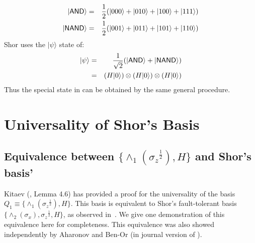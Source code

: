 \documentclass[twocolumn,11pt]{article}
\newcommand{\sqrtsz}{{\sigma_z}^{\frac{1}{2}}}
\begin{document}
\begin{eqnarray*}
|\mbox{\sf AND}\rangle &=&
\frac{1}{2}(|000\rangle+|010\rangle+|100\rangle+|111\rangle) \\
|\mbox{\sf NAND}\rangle &=&
\frac{1}{2}(|001\rangle+|011\rangle+|101\rangle+|110\rangle)
\end{eqnarray*}
Shor uses the $|\psi\rangle$ state of:
\begin{eqnarray*}
|\psi\rangle &=&
\frac{1}{\sqrt{2}}(|\mbox{\sf AND}\rangle+|\mbox{\sf NAND}\rangle) \\
             &=& (H|0\rangle)\otimes(H|0\rangle)\otimes(H|0\rangle)
\end{eqnarray*}
Thus the special state in \cite{shorFT} 
can be obtained by the same general procedure.




\section{Universality of Shor's Basis}

\subsection{Equivalence between $\{\wedge_1({\sigma_z}^\frac{1}{2}),H\}$
and Shor's basis'}
Kitaev (\cite{kitaevQC}, Lemma 4.6)
has provided a proof for the universality of the
basis $Q_1\equiv\{\wedge_1(\sqrtsz), H\}$.  This basis is equivalent to Shor's
fault-tolerant basis $\{\wedge_2(\sigma_x), \sqrtsz, H\}$, as 
observed in~\cite{kitaevQC}.
We give one demonstration of this equivalence here for
completeness.  This equivalence was also showed independently by Aharonov and
Ben-Or (in journal version of \cite{aharonov1}).
\end{document}
